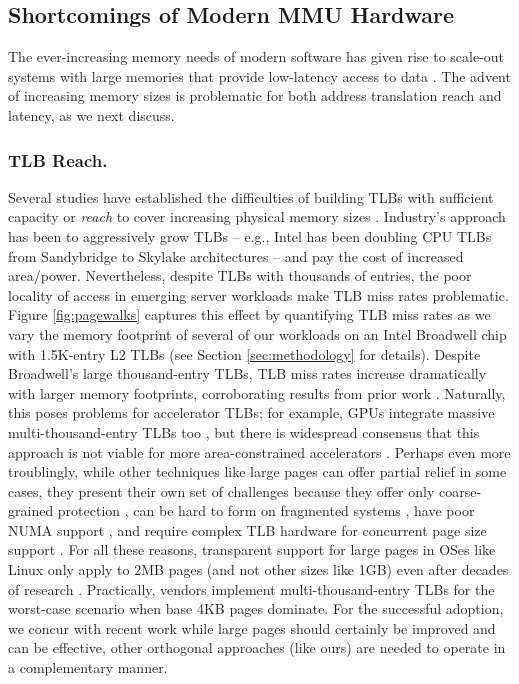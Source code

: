 \subsection{Shortcomings of Modern MMU Hardware}
The ever-increasing memory needs of modern software has given rise to
scale-out systems with large memories that provide low-latency access
to data \cite{ferdman:clearing, karakostas:performance, volos:fat,
  basu:efficient}. The advent of increasing memory sizes is
problematic for both address translation reach and latency, as we next
discuss.

\subsubsection{TLB Reach.}
Several studies have established the difficulties of building TLBs
with sufficient capacity or {\it reach} to cover increasing physical
memory sizes \cite{basu:efficient, haria:devirtualizing,
  pham:colt}. Industry's approach has been to aggressively grow TLBs
-- e.g., Intel has been doubling CPU TLBs from Sandybridge to Skylake
architectures -- and pay the cost of increased
area/power. Nevertheless, despite TLBs with thousands of entries, the
poor locality of access in emerging server workloads make TLB miss
rates problematic. Figure \ref{fig:pagewalks} captures this effect by
quantifying TLB miss rates as we vary the memory footprint of several
of our workloads on an Intel Broadwell chip with 1.5K-entry L2 TLBs
(see Section \ref{sec:methodology} for details). Despite Broadwell's
large thousand-entry TLBs, TLB miss rates increase dramatically with
larger memory footprints, corroborating results from prior work
\cite{basu:efficient}. Naturally, this poses problems for accelerator
TLBs; for example, GPUs integrate massive multi-thousand-entry TLBs
too \cite{vesely:observation, lowepower:inferring}, but there is
widespread consensus that this approach is not viable for more
area-constrained accelerators \cite{haria:devirtualizing,
  picorel:near-memory}. Perhaps even more troublingly, while other
techniques like large pages can offer partial relief in some cases,
they present their own set of challenges because they offer only
coarse-grained protection \cite{pham:large}, can be hard to form on
fragmented systems \cite{kwon:coordinated}, have poor NUMA support
\cite{gaud:large}, and require complex TLB hardware for concurrent
page size support \cite{cox:efficient}. For all these reasons,
transparent support for large pages in OSes like Linux only apply to
2MB pages (and not other sizes like 1GB) even after decades of
research \cite{arcangeli:transparent}. Practically, vendors implement
multi-thousand-entry TLBs for the worst-case scenario when base 4KB
pages dominate. For the successful adoption, we concur with recent
work \cite{pham:colt, basu:efficient, karakostas:redundant,
  haria:devirtualizing} while large pages should certainly be improved
and can be effective, other orthogonal approaches (like ours) are
needed to operate in a complementary manner.


